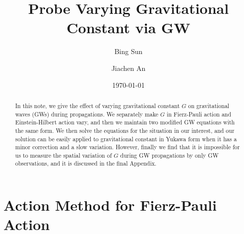 \documentclass[
    jor,
    amsmath,amssymb,preprint,
    superscriptaddress,
]{revtex4-2}
\begin{document}

\title[Probe Varying Gravitational Constant via GW]{Probe Varying Gravitational Constant via GW}%

\author{Bing Sun}
\author{Jiachen An}

\date{\today}%

\begin{abstract}
In this note, we give the effect of varying gravitational constant $G$ on  gravitational waves (GWs) during propagations. We separately make $G$ in Fierz-Pauli action and Einstein-Hilbert action vary, and then we maintain two modified GW equations with the same form. We then solve the equations for the situation in our interest, and our solution can be easily applied to gravitational constant in Yukawa form when it has a minor correction and a slow variation. However, finally we find that it is impossible for us to measure the spatial variation of $G$ during GW propagations by only GW observations, and it is discussed in the final Appendix.
\end{abstract}


\maketitle

\section{Action Method for Fierz-Pauli Action}
\end{document}
